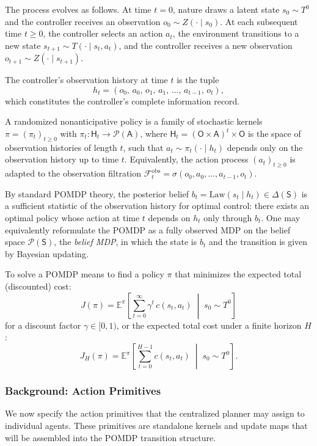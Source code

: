 The process evolves as follows. At time $t = 0$, nature draws a latent state
$s_0 \sim T^0$ and the controller receives an observation $o_0 \sim Z(\cdot \mid s_0)$.
At each subsequent time $t \ge 0$, the controller selects an action $a_t$, the environment
transitions to a new state $s_{t+1} \sim T(\cdot \mid s_t, a_t)$, and the controller receives
a new observation $o_{t+1} \sim Z(\cdot \mid s_{t+1})$.
 
The controller's observation history at time $t$ is the tuple
\[
h_t = (o_0,\, a_0,\, o_1,\, a_1,\, \ldots,\, a_{t-1},\, o_t),
\]
which constitutes the controller's complete information record. 
 
\begin{definition}[Policy]
A randomized nonanticipative policy is a family of stochastic kernels
$\pi = (\pi_t)_{t \ge 0}$ with $\pi_t : \mathsf{H}_t \to \mathcal{P}(\mathsf{A})$, where $\mathsf{H}_t = (\mathsf{O}\times\mathsf{A})^t\times\mathsf{O}$ is the space of observation histories of length $t$, such that $a_t \sim \pi_t(\cdot \mid h_t)$ depends only on the observation history up to time $t$. Equivalently, the action process $(a_t)_{t \ge 0}$ is adapted to the observation filtration $\mathcal{F}_t^{\mathrm{obs}} = \sigma(o_0, a_0, \ldots, a_{t-1}, o_t)$.
\end{definition}
 
\begin{remark}
By standard POMDP theory, the posterior belief
$b_t = \mathrm{Law}(s_t \mid h_t) \in \Delta(\mathsf{S})$ is a sufficient statistic of
the observation history for optimal control: there exists an optimal policy whose action
at time $t$ depends on $h_t$ only through $b_t$. One may equivalently reformulate the
POMDP as a fully observed MDP on the belief space $\mathcal{P}(\mathsf{S})$, the \emph{belief MDP}, in which the state is $b_t$ and the transition is given by Bayesian updating.
\end{remark}

To solve a POMDP means to find a policy $\pi$ that minimizes the expected total (discounted) cost:
\[
J(\pi) = \mathbb{E}^{\pi}\!\left[\sum_{t=0}^{\infty}\gamma^t\, c(s_t,a_t)\;\middle|\; s_0\sim T^0\right]
\]
for a discount factor $\gamma\in[0,1)$, or the expected total cost under a finite horizon $H$:
\[
J_H(\pi)=\mathbb{E}^\pi\!\left[\sum_{t=0}^{H-1}c(s_t,a_t)\;\middle|\;s_0\sim T^0\right].
\]

\subsubsection{Background: Action Primitives}
We now specify the action primitives that the centralized planner may assign to individual agents. These primitives are standalone kernels and update maps that will be assembled into the POMDP transition structure.
 
